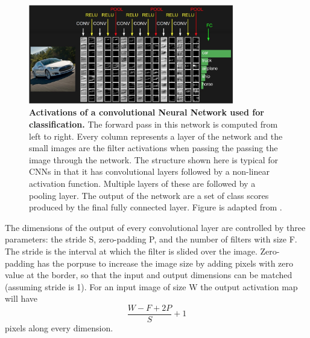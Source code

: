 \begin{figure}[h!]
	\centering
	\captionsetup{width=1\linewidth}
	\includegraphics[width=0.8\textwidth]{Figures/convnet.png}
	\caption{\textbf{Activations of a convolutional Neural Network used for classification.} The forward pass in this network is computed from left to right. Every column represents a layer of the network and the small images are the filter activations when passing the passing the image through the network. The structure shown here is typical for CNNs in that it has convolutional layers followed by a non-linear activation function. Multiple layers of these are followed by a pooling layer. The output of the network are a set of class scores produced by the final fully connected layer. Figure is adapted from \parencite{cs231}.}
	\label{fig:convnet}
\end{figure}

The dimensions of the output of every convolutional layer are controlled by three parameters: the stride S, zero-padding P, and the number of filters with size F. The stride is the interval at which the filter is slided over the image. Zero-padding has the porpuse to increase the image size by adding pixels with zero value at the border, so that the input and output dimensions can be matched (assuming stride is 1). For an input image of size W the output activation map will have
\begin{equation}
\frac{W - F +2P}{S} + 1
\end{equation}
pixels along every dimension. 

